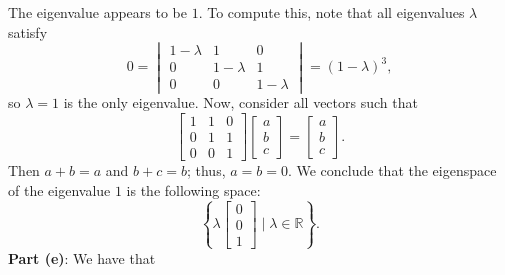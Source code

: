 \documentclass[11pt]{article}
\begin{document}
The eigenvalue appears to be $1$. To compute this, note that all eigenvalues $\lambda$ satisfy
\[
	0 = \begin{vmatrix} 1 - \lambda & 1 & 0 \\ 0 & 1 - \lambda & 1 \\ 0 & 0 & 1 - \lambda \end{vmatrix} = (1 - \lambda)^{3},
\]
so $\lambda = 1$ is the only eigenvalue. Now, consider all vectors such that
\[
	\begin{bmatrix} 1 & 1 & 0 \\ 0 & 1 & 1 \\ 0 & 0 & 1 \end{bmatrix} \begin{bmatrix} a \\ b \\ c \end{bmatrix} = \begin{bmatrix} a \\ b \\ c \end{bmatrix}.
\]
Then $a + b = a$ and $b + c = b$; thus, $a = b = 0$. We conclude that the eigenspace of the eigenvalue $1$ is the following space:
\[
	\boxed{\left\{ \lambda \begin{bmatrix} 0 \\ 0 \\ 1 \end{bmatrix} \mid \lambda \in \mathbb{R} \right\}}.
\]
\textbf{Part (e)}: We have that
\end{document}
